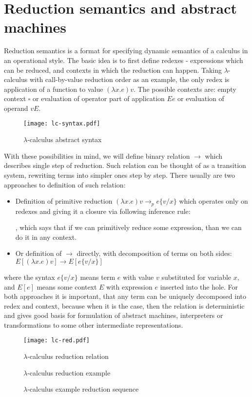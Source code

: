 \documentclass[inz, english, shortabstract]{iithesis}
\newcommand{\LC}{\(\lambda\)-calculus }
\begin{document}
\section{Reduction semantics and abstract machines}
Reduction semantics is a format for specifying dynamic semantics of a calculus in an operational style.
The basic idea is to first define redexes - expressions which can be reduced, and contexts in which the reduction can happen.
Taking \LC with call-by-value reduction order as an example, the only redex is application of a function to value $ (\lambda x . e) v $.
The possible contexts are: empty context $ \square $ or evaluation of operator part of application $ E e $ or evaluation of operand $ v E $.
\begin{figure}
  \texttt{[image: lc-syntax.pdf]}
  \caption{\LC abstract syntax}
  \label{fig:lc-syntax}
\end{figure}
With these possibilities in mind, we will define binary relation $ \longrightarrow $ which describes single step of reduction.
Such relation can be thought of as a transition system, rewriting terms into simpler ones step by step.
There usually are two approaches to definition of such relation:
\begin{itemize}
  \item Definition of primitive reduction $ (\lambda x . e) v \longrightarrow_p e\{v/x\} $ which operates only on redexes and giving it a closure via following inference rule:
  \begin{prooftree}
  \end{prooftree},
  which says that if we can primitively reduce some expression, than we can do it in any context.
  \item Or definition of $ \longrightarrow $ directly, with decomposition of terms on both sides: $ E[(\lambda x . e) v] \longrightarrow E[e\{v/x\}] $
\end{itemize}
where the syntax $ e\{v/x\} $ means term $ e $ with value $ v $ substituted for variable $ x $, and $ E[e] $ means some context $ E $ with expression $ e $ inserted into the hole.
For both approaches it is important, that any term can be uniquely decomposed into redex and context, because when it is the case, then the relation is deterministic and gives good basis for formulation of abstract machines, interpreters or transformations to some other intermediate representations.
\begin{figure}
  \texttt{[image: lc-red.pdf]} 
  \caption{\LC reduction relation}
  \label{fig:lc-red}
\end{figure}
\begin{figure}
  \LC reduction example
  \caption{\LC example reduction sequence}
  \label{fig:lc-red-example}
\end{figure}
\end{document}
